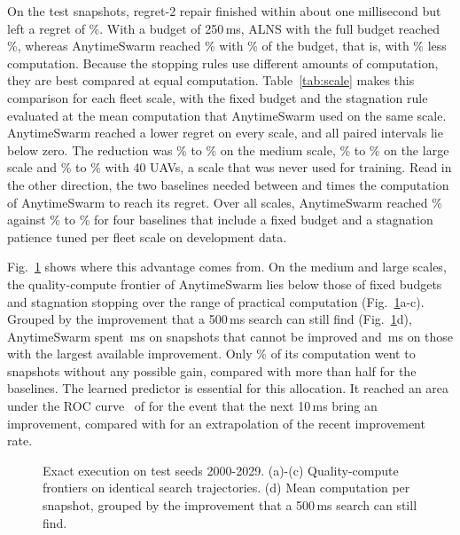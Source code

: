 \label{sec:static}
On the  test snapshots, regret-2 repair finished within about one millisecond but left a regret of
\%. With a budget of 250\,ms, ALNS with the full budget reached \%, whereas
AnytimeSwarm reached \% with \% of the budget, that is, with \% less computation.
Because the stopping rules use different amounts of computation, they are best compared at equal computation.
Table~\ref{tab:scale} makes this comparison for each fleet scale, with the fixed budget and the stagnation rule evaluated
at the mean computation that AnytimeSwarm used on the same scale. AnytimeSwarm reached a lower regret on every scale,
and all paired intervals lie below zero. The reduction was \% to \% on the
medium scale, \% to \% on the large scale and \% to
\% with 40 UAVs, a scale that was never used for training. Read in the other direction, the two
baselines needed between  and  times the computation of AnytimeSwarm to
reach its regret. Over all scales, AnytimeSwarm reached \% against \% to
\% for four baselines that include a fixed budget and a stagnation patience tuned per fleet scale
on development data.


Fig.~\ref{fig:static} shows where this advantage comes from. On the medium and large scales, the quality-compute
frontier of AnytimeSwarm lies below those of fixed budgets and stagnation stopping over the range of practical
computation (Fig.~\ref{fig:static}a-c). Grouped by the improvement that a 500\,ms search can still find
(Fig.~\ref{fig:static}d), AnytimeSwarm spent \,ms on snapshots that cannot be improved and
\,ms on those with the largest available improvement. Only \% of its computation went
to snapshots without any possible gain, compared with more than half for the baselines. The learned predictor is
essential for this allocation. It reached an area under the ROC curve~\cite{fawcett2006roc} of  for the
event that the next 10\,ms bring an improvement, compared with  for an extrapolation of the recent
improvement rate.

\begin{figure}[t]
\centering
{}\hspace{0.15in}
\caption{Exact execution on test seeds 2000-2029. (a)-(c) Quality-compute frontiers on identical search
trajectories. (d) Mean computation per snapshot, grouped by the improvement that a 500\,ms search can still
find.}\label{fig:static}
\end{figure}

